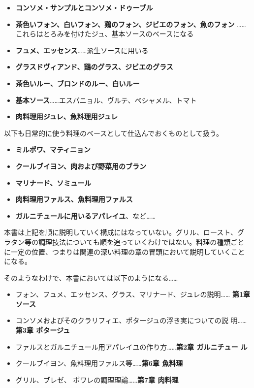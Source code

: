 \begin{itemize}
\tightlist
\item
  \textbf{コンソメ・サンプルとコンソメ・ドゥーブル}
\item
  \textbf{茶色いフォン、白いフォン、鶏のフォン、ジビエのフォン、魚のフォン
  }\ldots{}\ldots{}これらはとろみを付けたジュ、基本ソースのベースになる
\item
  \textbf{フュメ、エッセンス}\ldots{}\ldots{}派生ソースに用いる
\item
  \textbf{グラスドヴィアンド、鶏のグラス、ジビエのグラス}
\item
  \textbf{茶色いルー、ブロンドのルー、白いルー}
\item
  \textbf{基本ソース}\ldots{}\ldots{}エスパニョル、ヴルテ、ベシャメル、トマト
\item
  \textbf{肉料理用ジュレ、魚料理用ジュレ}
\end{itemize}

\vspace*{1.7\zw}

以下も日常的に使う料理のベースとして仕込んでおくものとして扱う。

\begin{itemize}
\tightlist
\item
  \textbf{ミルポワ、マティニョン}
\item
  \textbf{クールブイヨン、肉および野菜用のブラン}
\item
  \textbf{マリナード、ソミュール}
\item
  \textbf{肉料理用ファルス、魚料理用ファルス}
\item
  \textbf{ガルニチュールに用いるアパレイユ}、など\ldots{}\ldots{}
\end{itemize}

\vspace*{1.7\zw}

本書は上記を順に説明していく構成にはなっていない。グリル、ロースト、グ
ラタン等の調理技法についても順を追っていくわけではない。料理の種類ごと
に一定の位置、つまりは関連の深い料理の章の冒頭において説明していくこと
になる。

\vspace*{1.7\zw}

そのようなわけで、本書においては以下のようになる\ldots{}\ldots{}

\begin{itemize}
\tightlist
\item
  フォン、フュメ、エッセンス、グラス、マリナード、ジュレの説明\ldots{}\ldots{}
  \textbf{ 第1章 ソース}
\item
  コンソメおよびそのクラリフィエ、ポタージュの浮き実についての説
  明\ldots{}\ldots{}\textbf{第3章 ポタージュ}
\item
  ファルスとガルニチュール用アパレイユの作り方\ldots{}\ldots{}\textbf{第2章
  ガルニチュー ル}
\item
  クールブイヨン、魚料理用ファルス等\ldots{}\ldots{}\textbf{第6章
  魚料理}
\item
  グリル、ブレゼ、 ポワレの調理理論\ldots{}\ldots{}\textbf{第7章 肉料理}
\end{itemize}

